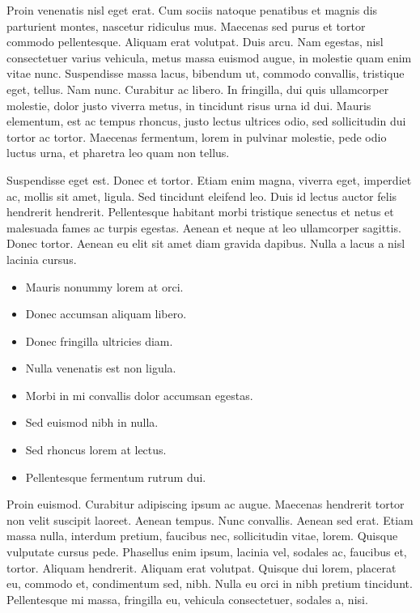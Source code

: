 Proin venenatis nisl eget erat. Cum sociis natoque penatibus et magnis
dis parturient montes, nascetur ridiculus mus. Maecenas sed purus et
tortor commodo pellentesque. Aliquam erat volutpat. Duis arcu. Nam
egestas, nisl consectetuer varius vehicula, metus massa euismod augue,
in molestie quam enim vitae nunc. Suspendisse massa lacus, bibendum
ut, commodo convallis, tristique eget, tellus. Nam nunc. Curabitur ac
libero. In fringilla, dui quis ullamcorper molestie, dolor justo
viverra metus, in tincidunt risus urna id dui. Mauris elementum, est
ac tempus rhoncus, justo lectus ultrices odio, sed sollicitudin dui
tortor ac tortor. Maecenas fermentum, lorem in pulvinar molestie, pede
odio luctus urna, et pharetra leo quam non tellus.

Suspendisse eget est. Donec et tortor. Etiam enim magna, viverra eget,
imperdiet ac, mollis sit amet, ligula. Sed tincidunt eleifend
leo. Duis id lectus auctor felis hendrerit hendrerit. Pellentesque
habitant morbi tristique senectus et netus et malesuada fames ac
turpis egestas. Aenean et neque at leo ullamcorper sagittis. Donec
tortor. Aenean eu elit sit amet diam gravida dapibus. Nulla a lacus a
nisl lacinia cursus.

\begin{itemize}
\item Mauris nonummy lorem at orci.
\item Donec accumsan aliquam libero.
\item Donec fringilla ultricies diam.
\item Nulla venenatis est non ligula.
\item Morbi in mi convallis dolor accumsan egestas.
\item Sed euismod nibh in nulla.
\item Sed rhoncus lorem at lectus.
\item Pellentesque fermentum rutrum dui.
\end{itemize}

Proin euismod. Curabitur adipiscing ipsum ac augue. Maecenas hendrerit
tortor non velit suscipit laoreet. Aenean tempus. Nunc
convallis. Aenean sed erat. Etiam massa nulla, interdum pretium,
faucibus nec, sollicitudin vitae, lorem. Quisque vulputate cursus
pede. Phasellus enim ipsum, lacinia vel, sodales ac, faucibus et,
tortor. Aliquam hendrerit. Aliquam erat volutpat. Quisque dui lorem,
placerat eu, commodo et, condimentum sed, nibh. Nulla eu orci in nibh
pretium tincidunt. Pellentesque mi massa, fringilla eu, vehicula
consectetuer, sodales a, nisi.

